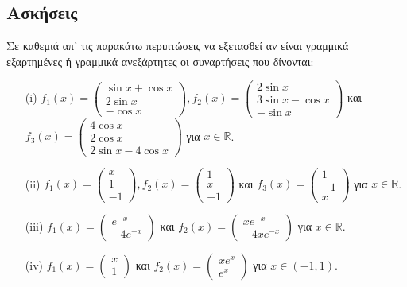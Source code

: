\documentclass[11pt,a4paper,twoside]{book}
\begin{document}
\subsection{Ασκήσεις}
\begin{askhseis}
    \item Σε καθεμιά απ' τις παρακάτω περιπτώσεις να εξετασθεί αν είναι γραμμικά εξαρτημένες ή γραμμικά ανεξάρτητες οι συναρτήσεις που δίνονται:
    \begin{enumerate}
        \item[(i)] $f_1(x) = \begin{pmatrix} \sin x + \cos x \\ 2\sin x \\ -\cos x \end{pmatrix}, f_2(x) = \begin{pmatrix} 2\sin x \\ 3\sin x - \cos x \\ -\sin x \end{pmatrix}$ και $f_3(x) = \begin{pmatrix} 4\cos x \\ 2\cos x \\ 2\sin x - 4\cos x \end{pmatrix}$ για $x \in \mathbb{R}$.
        \item[(ii)] $f_1(x) = \begin{pmatrix} x \\ 1 \\ -1 \end{pmatrix}, f_2(x) = \begin{pmatrix} 1 \\ x \\ -1 \end{pmatrix}$ και $f_3(x) = \begin{pmatrix} 1 \\ -1 \\ x \end{pmatrix}$ για $x \in \mathbb{R}$.
        \item[(iii)] $f_1(x) = \begin{pmatrix} e^{-x} \\ -4e^{-x} \end{pmatrix}$ και $f_2(x) = \begin{pmatrix} xe^{-x} \\ -4xe^{-x} \end{pmatrix}$ για $x \in \mathbb{R}$.
    \item[(iv)] $f_1(x) = \begin{pmatrix} x \\ 1 \end{pmatrix}$ και $f_2(x) = \begin{pmatrix} xe^x \\ e^x \end{pmatrix}$ για $x \in (-1, 1)$.

\end{enumerate}
\end{askhseis}
\end{document}
